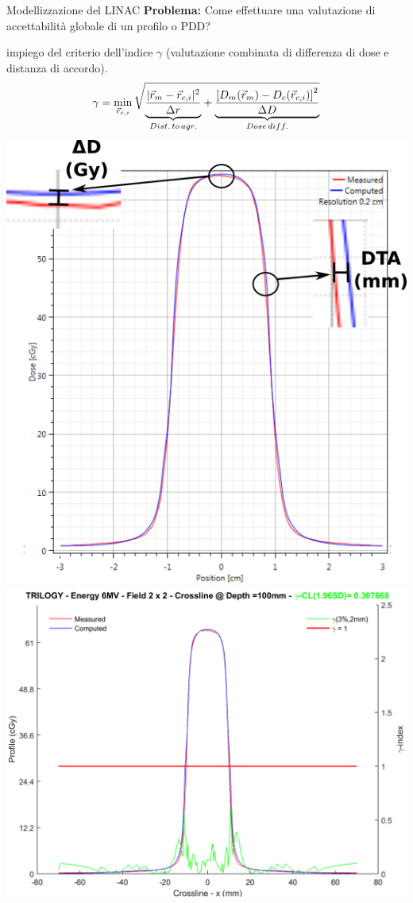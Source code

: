 \documentclass{beamer}
\begin{document}
\begin{frame}[t]{Modellizzazione del LINAC}
\scriptsize
\alert{\bf Problema:} Come effettuare una valutazione di accettabilità globale di un profilo o PDD?\\ \vspace{.3cm}

 impiego del criterio dell'indice $\gamma$ (valutazione combinata di differenza di dose e distanza di accordo).
$$\gamma = \min_{\vec{r}_{c,i}} \sqrt{\smash[b]{\underbrace{\frac{|\vec{r}_{m}-\vec{r}_{c,i}|^2}{\Delta r}}_{Dist.\,to\,agr.}}   + \smash[b]{\underbrace{\frac{\left[D_{m}(\vec{r}_{m})-D_{c}(\vec{r}_{c,i})\right]^2}{\Delta D}}_{Dose\,diff.}}}$$
\vspace{.1cm}
\begin{columns}
\includegraphics[width=\textwidth]{./img/gamma_example_prof.png}
\includegraphics[width=\textwidth]{./img/profCrossline_2x2_depth_100.png}

\end{columns}
\end{frame}
\end{document}
